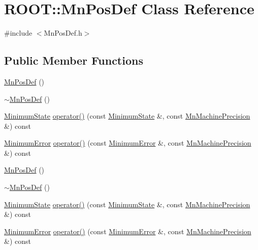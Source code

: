 \hypertarget{classROOT_1_1Minuit2_1_1MnPosDef}{}\section{R\+O\+OT\+:\+:Mn\+Pos\+Def Class Reference}
\label{classROOT_1_1Minuit2_1_1MnPosDef}


{\ttfamily \#include $<$Mn\+Pos\+Def.\+h$>$}

\subsection*{Public Member Functions}
\begin{DoxyCompactItemize}
\item 
\mbox{\hyperlink{classROOT_1_1Minuit2_1_1MnPosDef_a937f62100fca6ac5e8f32c882639be9c}{Mn\+Pos\+Def}} ()
\item 
\mbox{\hyperlink{classROOT_1_1Minuit2_1_1MnPosDef_a1bc55c7ddd347c0f7834b7d64a62b964}{$\sim$\+Mn\+Pos\+Def}} ()
\item 
\mbox{\hyperlink{classROOT_1_1Minuit2_1_1MinimumState}{Minimum\+State}} \mbox{\hyperlink{classROOT_1_1Minuit2_1_1MnPosDef_a5a550c841e9b62d3c09cdf9df61a88f4}{operator()}} (const \mbox{\hyperlink{classROOT_1_1Minuit2_1_1MinimumState}{Minimum\+State}} \&, const \mbox{\hyperlink{classROOT_1_1Minuit2_1_1MnMachinePrecision}{Mn\+Machine\+Precision}} \&) const
\item 
\mbox{\hyperlink{classROOT_1_1Minuit2_1_1MinimumError}{Minimum\+Error}} \mbox{\hyperlink{classROOT_1_1Minuit2_1_1MnPosDef_ace62b61f17edf0c57ef824003b99b9ec}{operator()}} (const \mbox{\hyperlink{classROOT_1_1Minuit2_1_1MinimumError}{Minimum\+Error}} \&, const \mbox{\hyperlink{classROOT_1_1Minuit2_1_1MnMachinePrecision}{Mn\+Machine\+Precision}} \&) const
\item 
\mbox{\hyperlink{classROOT_1_1Minuit2_1_1MnPosDef_a937f62100fca6ac5e8f32c882639be9c}{Mn\+Pos\+Def}} ()
\item 
\mbox{\hyperlink{classROOT_1_1Minuit2_1_1MnPosDef_a1bc55c7ddd347c0f7834b7d64a62b964}{$\sim$\+Mn\+Pos\+Def}} ()
\item 
\mbox{\hyperlink{classROOT_1_1Minuit2_1_1MinimumState}{Minimum\+State}} \mbox{\hyperlink{classROOT_1_1Minuit2_1_1MnPosDef_a5a550c841e9b62d3c09cdf9df61a88f4}{operator()}} (const \mbox{\hyperlink{classROOT_1_1Minuit2_1_1MinimumState}{Minimum\+State}} \&, const \mbox{\hyperlink{classROOT_1_1Minuit2_1_1MnMachinePrecision}{Mn\+Machine\+Precision}} \&) const
\item 
\mbox{\hyperlink{classROOT_1_1Minuit2_1_1MinimumError}{Minimum\+Error}} \mbox{\hyperlink{classROOT_1_1Minuit2_1_1MnPosDef_ace62b61f17edf0c57ef824003b99b9ec}{operator()}} (const \mbox{\hyperlink{classROOT_1_1Minuit2_1_1MinimumError}{Minimum\+Error}} \&, const \mbox{\hyperlink{classROOT_1_1Minuit2_1_1MnMachinePrecision}{Mn\+Machine\+Precision}} \&) const
\end{DoxyCompactItemize}


